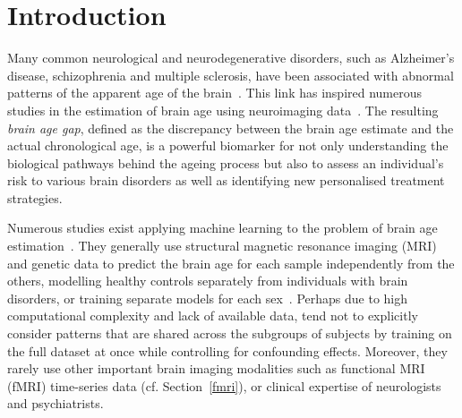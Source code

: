 \chapter{Introduction}



Many common neurological and neurodegenerative disorders, such as Alzheimer’s disease, schizophrenia and multiple sclerosis, have been associated with abnormal patterns of the apparent age of the brain~\cite{kaufmann2019}. This link has inspired numerous studies in the estimation of brain age using neuroimaging data~\cite{franke2019ten}. The resulting \textit{brain age gap}, defined as the discrepancy between the brain age estimate and the actual chronological age, is a powerful biomarker for not only understanding the biological pathways behind the ageing process but also to assess an individual’s risk to various brain disorders as well as identifying new personalised treatment strategies.


Numerous studies exist applying machine learning to the problem of brain age estimation~\cite{franke2019ten}. They generally use structural magnetic resonance imaging (MRI) and genetic data to predict the brain age for each sample independently from the others, modelling healthy controls separately from individuals with brain disorders, or training separate models for each sex~\cite{kaufmann2019,niu2019improved}. Perhaps due to high computational complexity and lack of available data, tend not to explicitly consider patterns that are shared across the subgroups of subjects by training on the full dataset at once while controlling for confounding effects. Moreover, they rarely use other important brain imaging modalities such as functional MRI (fMRI) time-series data (cf. Section~\ref{fmri}), or clinical expertise of neurologists and psychiatrists.


